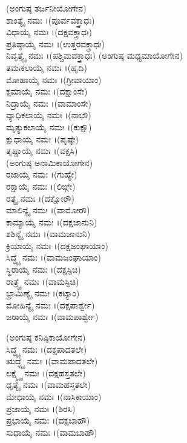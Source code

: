 (ಅಂಗುಷ್ಠ ತರ್ಜನೀಯೋಗೇನ)\\
 ಶಾಂತ್ಯೈ ನಮಃ ।(ಪೂರ್ವವಕ್ತ್ರಾಧಃ)\\
 ವಿಧಾಯೈ ನಮಃ ।(ದಕ್ಷವಕ್ತ್ರಾಧಃ)\\
 ಪ್ರತಿಷ್ಠಾಯೈ ನಮಃ ।(ಉತ್ತರವಕ್ತ್ರಾಧಃ)\\
 ನಿವೃತ್ತ್ಯೈ ನಮಃ ।(ಪಶ್ಚಿಮವಕ್ತ್ರಾಧಃ)
\eject
(ಅಂಗುಷ್ಠ ಮಧ್ಯಮಾಯೋಗೇನ)\\
 ತಮಃಕಲಾಯೈ ನಮಃ ।(ಹೃದಿ)\\
 ಮೋಹಾಯೈ ನಮಃ ।(ಗ್ರೀವಾಯಾಂ)\\
 ಕ್ಷಮಾಯೈ ನಮಃ ।(ದಕ್ಷಾಂಸೇ)\\
 ನಿದ್ರಾಯೈ ನಮಃ ।(ವಾಮಾಂಸೇ)\\
 ವ್ಯಾಧಿಕಲಾಯೈ ನಮಃ ।(ನಾಭೌ)\\
 ಮೃತ್ಯುಕಲಾಯೈ ನಮಃ ।(ಕುಕ್ಷೌ)\\
 ಕ್ಷುಧಾಯೈ ನಮಃ ।(ಪೃಷ್ಠೇ)\\
 ತೃಷ್ಣಾಯೈ ನಮಃ ।(ವಕ್ಷಸಿ)\\
(ಅಂಗುಷ್ಠ ಅನಾಮಿಕಾಯೋಗೇನ)\\
 ರಜಾಯೈ ನಮಃ ।(ಗುಹ್ಯೇ)\\
 ರಕ್ಷಾಯೈ ನಮಃ ।(ಲಿಙ್ಗೇ)\\
 ರತ್ಯೈ ನಮಃ ।(ದಕ್ಷೋರೌ)\\
 ಮಾಲಿನ್ಯೈ ನಮಃ ।(ವಾಮೋರೌ)\\
 ಕಾಮ್ಯಾಯೈ ನಮಃ ।(ದಕ್ಷಜಾನುನಿ)\\
 ಶಶಿನ್ಯೈ ನಮಃ ।(ವಾಮಜಾನುನಿ)\\
 ಕ್ರಿಯಾಯೈ ನಮಃ ।(ದಕ್ಷಜಂಘಾಯಾಂ)\\
 ಸಿದ್ಧ್ಯೈ ನಮಃ ।(ವಾಮಜಂಘಾಯಾಂ)\\
 ಸ್ಥಿರಾಯೈ ನಮಃ ।(ದಕ್ಷಸ್ಫಿಚಿ)\\
 ರಾತ್ರ್ಯೈ ನಮಃ ।(ವಾಮಸ್ಫಿಚಿ)\\
 ಭ್ರಾಮಿಣ್ಯೈ ನಮಃ ।(ಕಟ್ಯಾಂ)\\
 ಮೋಹಿನ್ಯೈ ನಮಃ ।(ದಕ್ಷಪಾರ್ಶ್ವೇ)\\
  ಜರಾಯೈ ನಮಃ ।(ವಾಮಪಾರ್ಶ್ವೇ)

(ಅಂಗುಷ್ಠ ಕನಿಷ್ಠಿಕಾಯೋಗೇನ)\\
 ಸಿದ್ಧ್ಯೈ ನಮಃ ।(ದಕ್ಷಪಾದತಲೇ)\\
 ಋದ್ಧ್ಯೈ ನಮಃ ।(ವಾಮಪಾದತಲೇ)\\
 ಲಕ್ಷ್ಮ್ಯೈ ನಮಃ ।(ದಕ್ಷಹಸ್ತತಲೇ)\\
 ಧೃತ್ಯೈ ನಮಃ ।(ವಾಮಹಸ್ತತಲೇ)\\
 ಮೇಧಾಯೈ ನಮಃ ।(ನಾಸಿಕಾಯಾಂ)\\
 ಪ್ರಜಾಯೈ ನಮಃ ।(ಶಿರಸಿ)\\
 ಪ್ರಭಾಯೈ ನಮಃ ।(ದಕ್ಷಬಾಹೌ)\\
 ಸುಧಾಯೈ ನಮಃ ।(ವಾಮಬಾಹೌ)
